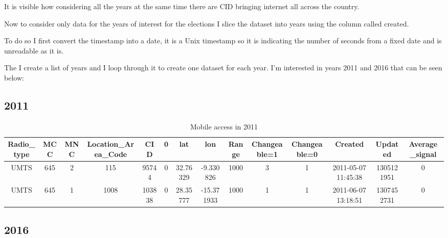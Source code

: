 \documentclass[
]{article}
\begin{document}
It is visible how considering all the years at the same time there are
CID bringing internet all across the country.

Now to consider only data for the years of interest for the elections I
slice the dataset into years using the column called created.

To do so I first convert the timestamp into a date, it is a Unix
timestamp so it is indicating the number of seconds from a fixed date
and is unreadable as it is.

The I create a list of years and I loop through it to create one dataset
for each year. I'm interested in years 2011 and 2016 that can be seen
below:

\hypertarget{section}{%
\subsection{2011}\label{section}}

\begin{longtable}[t]{cccccccccccccc}
\caption{\label{tab:anotheryear}\resizebox{\textwidth}{!} {Mobile access in 2011}}\\
\toprule
Radio\_type & MCC & MNC & Location\_Area\_Code & CID & 0 & lat & lon & Range & Changeable=1 & Changeable=0 & Created & Updated & Average\_signal\\
\midrule
UMTS & 645 & 2 & 115 & 95744 & 0 & 32.76329 & -9.330826 & 1000 & 3 & 1 & 2011-05-07 11:45:38 & 1305121951 & 0\\
UMTS & 645 & 1 & 1008 & 103838 & 0 & 28.35777 & -15.371933 & 1000 & 1 & 1 & 2011-06-07 13:18:51 & 1307452731 & 0\\
\bottomrule
\end{longtable}

\hypertarget{section-1}{%
\subsection{2016}\label{section-1}}
\end{document}
